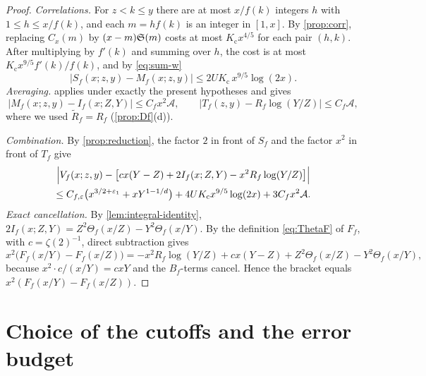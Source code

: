 \begin{proof}
\emph{Correlations.} For $z<k\le y$ there are at most $x/f(k)$ integers $h$ with $1\le h\le x/f(k)$, and each $m=hf(k)$ is an integer in $[1,x]$. By \cref{prop:corr}, replacing $C_x(m)$ by $(x-m)\mathfrak S(m)$ costs at most $K_{\mathrm c}x^{4/5}$ for each pair $(h,k)$. After multiplying by $f'(k)$ and summing over $h$, the cost is at most $K_{\mathrm c}x^{9/5}f'(k)/f(k)$, and by \eqref{eq:sum-w}
\begin{equation}\label{eq:S-M}
|S_f(x;z,y)-M_f(x;z,y)|\le2UK_{\mathrm c}\,x^{9/5}\log(2x).
\end{equation}
\emph{Averaging.}  applies under exactly the present hypotheses and gives
\[
|M_f(x;z,y)-I_f(x;Z,Y)|\le C_fx^2\mathcal A,\qquad|T_f(z,y)-R_f\log(Y/Z)|\le C_f\mathcal A,
\]
where we used $\widetilde R_f=R_f$ (\cref{prop:Df}(d)).

\emph{Combination.} By \cref{prop:reduction}, the factor $2$ in front of $S_f$ and the factor $x^2$ in front of $T_f$ give
\begin{multline*}
\Bigl|V_f(x;z,y)-\bigl[cx(Y-Z)+2I_f(x;Z,Y)-x^2R_f\log(Y/Z)\bigr]\Bigr|\\
\le C_{f,\varepsilon}\bigl(x^{3/2+\varepsilon_1}+xY^{1-1/d}\bigr)+4UK_{\mathrm c}x^{9/5}\log(2x)+3C_fx^2\mathcal A.
\end{multline*}
\emph{Exact cancellation.} By \cref{lem:integral-identity}, $2I_f(x;Z,Y)=Z^2\Theta_f(x/Z)-Y^2\Theta_f(x/Y)$. By the definition \eqref{eq:ThetaF} of $F_f$, with $c=\zeta(2)^{-1}$, direct subtraction gives
\[
x^2\bigl(F_f(x/Y)-F_f(x/Z)\bigr)=-x^2R_f\log(Y/Z)+cx(Y-Z)+Z^2\Theta_f(x/Z)-Y^2\Theta_f(x/Y),
\]
because $x^2\cdot c/(x/Y)=cxY$ and the $B_f$-terms cancel. Hence the bracket equals $x^2(F_f(x/Y)-F_f(x/Z))$.
\end{proof}

\section{Choice of the cutoffs and the error budget}\label{sec:budget}

